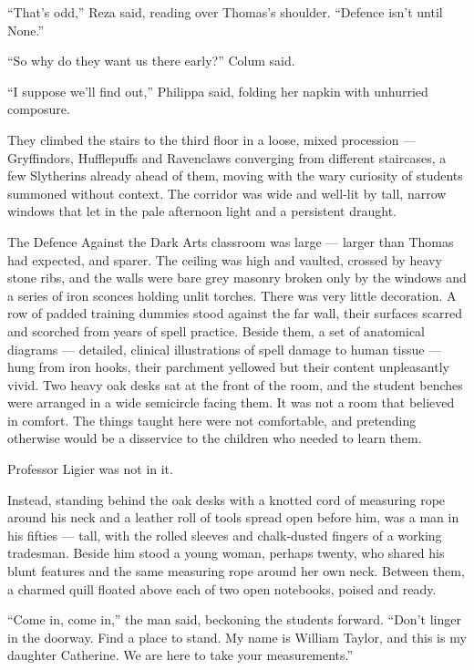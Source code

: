\enquote{That's odd,} Reza said, reading over Thomas's shoulder. \enquote{Defence isn't until None.}
 
\enquote{So why do they want us there early?} Colum said.
 
\enquote{I suppose we'll find out,} Philippa said, folding her napkin with unhurried composure.
 
They climbed the stairs to the third floor in a loose, mixed procession --- Gryffindors, Hufflepuffs and Ravenclaws converging from different staircases, a few Slytherins already ahead of them, moving with the wary curiosity of students summoned without context. The corridor was wide and well-lit by tall, narrow windows that let in the pale afternoon light and a persistent draught.
 
The Defence Against the Dark Arts classroom was large --- larger than Thomas had expected, and sparer. The ceiling was high and vaulted, crossed by heavy stone ribs, and the walls were bare grey masonry broken only by the windows and a series of iron sconces holding unlit torches. There was very little decoration. A row of padded training dummies stood against the far wall, their surfaces scarred and scorched from years of spell practice. Beside them, a set of anatomical diagrams --- detailed, clinical illustrations of spell damage to human tissue --- hung from iron hooks, their parchment yellowed but their content unpleasantly vivid. Two heavy oak desks sat at the front of the room, and the student benches were arranged in a wide semicircle facing them. It was not a room that believed in comfort. The things taught here were not comfortable, and pretending otherwise would be a disservice to the children who needed to learn them.
 
Professor Ligier was not in it.
 
Instead, standing behind the oak desks with a knotted cord of measuring rope around his neck and a leather roll of tools spread open before him, was a man in his fifties --- tall, with the rolled sleeves and chalk-dusted fingers of a working tradesman. Beside him stood a young woman, perhaps twenty, who shared his blunt features and the same measuring rope around her own neck. Between them, a charmed quill floated above each of two open notebooks, poised and ready.
 
\enquote{Come in, come in,} the man said, beckoning the students forward. \enquote{Don't linger in the doorway. Find a place to stand. My name is William Taylor, and this is my daughter Catherine. We are here to take your measurements.}
 
